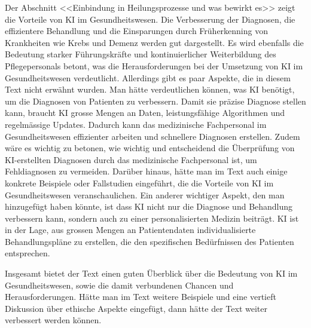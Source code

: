 \documentclass{article}
\begin{document}
{\begin{itemize}
Der Abschnitt <<Einbindung in Heilungsprozesse und was bewirkt es>> zeigt die Vorteile von KI
im Gesundheitswesen. Die Verbesserung der Diagnosen, die effizientere Behandlung und die Einsparungen
durch Früherkenning von Krankheiten wie Krebs und Demenz werden gut dargestellt. Es wird ebenfalls die Bedeutung starker 
Führungskräfte und kontinuierlicher Weiterbildung des Pflegepersonals betont, was die Herausforderungen bei der Umsetzung
von KI im Gesundheitswesen verdeutlicht. Allerdings gibt es paar Aspekte, die in diesem Text nicht erwähnt wurden.
Man hätte verdeutlichen können, was KI benötigt, um die Diagnosen von Patienten zu verbessern. Damit sie präzise Diagnose stellen kann, 
braucht KI grosse Mengen an Daten, leistungsfähige Algorithmen und regelmässige Updates. Dadurch kann das medizinische Fachpersonal im Gesundheitswesen
effizienter arbeiten und schnellere Diagnosen erstellen. Zudem wäre es wichtig zu betonen, wie wichtig und entscheidend die Überprüfung von KI-erstellten Diagnosen
durch das medizinische Fachpersonal ist, um Fehldiagnosen zu vermeiden.  
Darüber hinaus, hätte man im Text auch einige konkrete Beispiele oder Fallstudien eingeführt, die die Vorteile von KI im Gesundheitswesen
veranschaulichen. Ein anderer wichtiger Aspekt, den man hinzugefügt haben könnte, ist dass KI nicht nur die Diagnose und Behandlung verbessern kann, sondern
auch zu einer personalisierten Medizin beiträgt. KI ist in der Lage, aus grossen Mengen an Patientendaten individualisierte Behandlungspläne zu erstellen,
die den spezifischen Bedürfnissen des Patienten entsprechen. \citep{clutch}
\end{itemize}

\newpage

Insgesamt bietet der Text einen guten Überblick über die Bedeutung von KI im Gesundheitswesen, sowie die damit verbundenen Chancen und Herausforderungen.
Hätte man im Text weitere Beispiele und eine vertieft Diskussion über ethische Aspekte eingefügt, dann hätte der Text weiter verbessert werden können. 




}





\printbibliography
\end{document}
